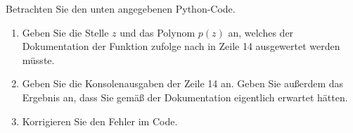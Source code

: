 Betrachten Sie den unten angegebenen Python-Code.
\begin{enumerate}
	\item Geben Sie die Stelle $z$ und das Polynom $p(z)$ an, welches der Dokumentation der Funktion zufolge nach in Zeile 14 ausgewertet werden müsste.
	\item Geben Sie die Konsolenausgaben der Zeile 14 an. Geben Sie außerdem das Ergebnis an, dass Sie gemäß der Dokumentation eigentlich erwartet hätten.
	\item Korrigieren Sie den Fehler im Code.
\end{enumerate}

